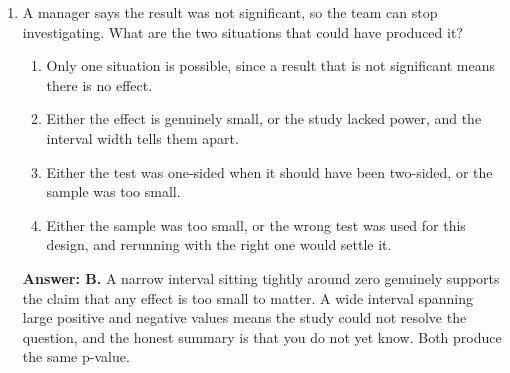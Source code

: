 \documentclass[11pt]{article}
\begin{document}
\begin{enumerate}[itemsep=14pt]
\item A manager says the result was not significant, so the team can stop investigating. What are the two situations that could have produced it?

\begin{enumerate}[label=\Alph*., itemsep=1pt, topsep=3pt]
  \item Only one situation is possible, since a result that is not significant means there is no effect.
  \item Either the effect is genuinely small, or the study lacked power, and the interval width tells them apart.
  \item Either the test was one-sided when it should have been two-sided, or the sample was too small.
  \item Either the sample was too small, or the wrong test was used for this design, and rerunning with the right one would settle it.
\end{enumerate}

\vspace{2pt}
\textbf{Answer: B.} A narrow interval sitting tightly around zero genuinely supports the claim that any effect is too small to matter. A wide interval spanning large positive and negative values means the study could not resolve the question, and the honest summary is that you do not yet know. Both produce the same p-value.
\vspace{4pt}

\end{enumerate}
\end{document}
